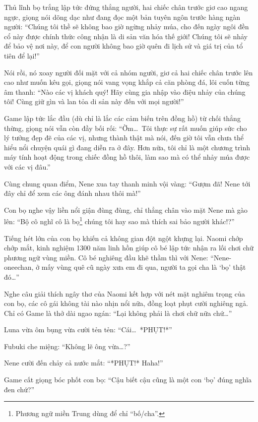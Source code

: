 \documentclass[../main.tex]{subfiles}
\begin{document}
Thủ lĩnh bọ trắng lập tức đứng thẳng người, hai chiếc chân trước giơ cao ngang ngực, giọng nói dõng dạc như đang đọc một bản tuyên ngôn trước hàng ngàn người: ``Chúng tôi thề sẽ không bao giờ ngừng nhảy múa, cho đến ngày ngôi đền cổ này được chính thức công nhận là di sản văn hóa thế giới! Chúng tôi sẽ nhảy để bảo vệ nơi này, để con người không bao giờ quên đi lịch sử và giá trị của tổ tiên để lại!''

Nói rồi, nó xoay người đối mặt với cả nhóm người, giơ cả hai chiếc chân trước lên cao như muốn kêu gọi, giọng nói vang vọng khắp cả căn phòng đá, lôi cuốn từng âm thanh: ``Nào các vị khách quý! Hãy cùng gia nhập vào điệu nhảy của chúng tôi! Cùng giữ gìn và lan tỏa di sản này đến với mọi người!''

Game lập tức lắc đầu (dù chỉ là lắc các cảm biến trên đồng hồ) từ chối thẳng thừng, giọng nói vẫn còn đầy bối rối: ``Ờm\dots\ Tôi thực sự rất muốn giúp sức cho lý tưởng đẹp đẽ của các vị, nhưng thành thật mà nói, đến giờ tôi vẫn chưa thể hiểu nổi chuyện quái gì đang diễn ra ở đây. Hơn nữa, tôi chỉ là một chương trình máy tính hoạt động trong chiếc đồng hồ thôi, làm sao mà có thể nhảy múa được với các vị đâu.''

Cùng chung quan điểm, Nene xua tay thanh minh vội vàng: ``Gượm đã! Nene tới đây chỉ để xem các ông đánh nhau thôi mà!''

Con bọ nghe vậy liền nổi giận đùng đùng, chỉ thẳng chân vào mặt Nene mà gào lên: ``Bộ cô nghĩ cô là bọ\footnote{Phương ngữ miền Trung dùng để chỉ ``bố/cha''.} chúng tôi hay sao mà thích sai bảo người khác!?''

Tiếng hét lớn của con bọ khiến cả không gian đột ngột khựng lại. Naomi chớp chớp mắt, kinh nghiệm 1300 năm linh hồn giúp cô bé lập tức nhận ra lối chơi chữ phương ngữ vùng miền. Cô bé nghiêng đầu khẽ thầm thì với Nene: ``Nene-oneechan, ở mấy vùng quê cũ ngày xưa em đi qua, người ta gọi cha là `bọ' thật đó\dots''

Nghe câu giải thích ngây thơ của Naomi kết hợp với nét mặt nghiêm trọng của con bọ, các cô gái không tài nào nhịn nổi nữa, đồng loạt phụt cười nghiêng ngả. Chỉ có Game là thở dài ngao ngán: ``Lại không phải là chơi chữ nữa chứ\dots''

Luna vừa ôm bụng vừa cười tẻn tẻn: ``Cái\dots\ *PHỤT!*''

Fubuki che miệng: ``Không lẽ ông vừa\dots?''

Nene cười đến chảy cả nước mắt: ``*PHỤT!* Haha!''

Game cất giọng bóc phốt con bọ: ``Cậu biết cậu cũng là một con `bọ' đúng nghĩa đen chứ?''
\end{document}
